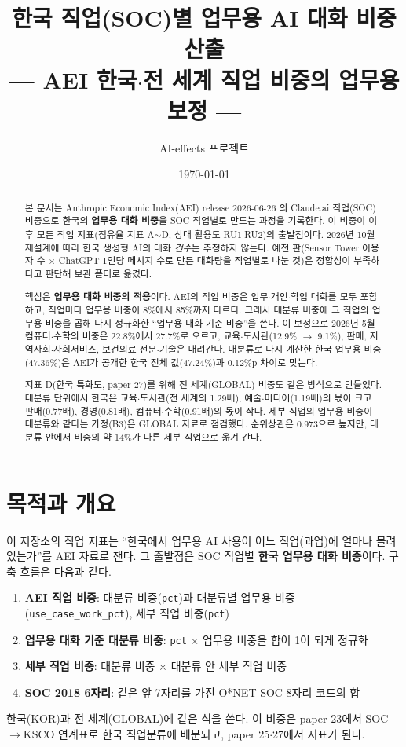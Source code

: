 \documentclass[11pt]{article}
\title{한국 직업(SOC)별 업무용 AI 대화 비중 산출\\[2mm]
\large --- AEI 한국$\cdot$전 세계 직업 비중의 업무용 보정 ---}
\author{AI-effects 프로젝트}
\date{\today}
\begin{document}
\maketitle

\begin{abstract}
\noindent 본 문서는 Anthropic Economic Index(AEI) release 2026-06-26 \parencite{massenkoff-2026-cadences}의 Claude.ai 직업(SOC) 비중으로 한국의 \textbf{업무용 대화 비중}을 SOC 직업별로 만드는 과정을 기록한다. 이 비중이 이후 모든 직업 지표(점유율 지표 A$\sim$D, 상대 활용도 RU1$\cdot$RU2)의 출발점이다. 2026년 10월 재설계에 따라 한국 생성형 AI의 대화 \emph{건수}는 추정하지 않는다. 예전 판(Sensor Tower 이용자 수 $\times$ ChatGPT 1인당 메시지 수로 만든 대화량을 직업별로 나눈 것)은 정합성이 부족하다고 판단해 보관 폴더로 옮겼다.

핵심은 \textbf{업무용 대화 비중의 적용}이다. AEI의 직업 비중은 업무$\cdot$개인$\cdot$학업 대화를 모두 포함하고, 직업마다 업무용 비중이 8\%에서 85\%까지 다르다. 그래서 대분류 비중에 그 직업의 업무용 비중을 곱해 다시 정규화한 ``업무용 대화 기준 비중''을 쓴다. 이 보정으로 2026년 5월 컴퓨터$\cdot$수학의 비중은 22.8\%에서 27.7\%로 오르고, 교육$\cdot$도서관(12.9\% $\to$ 9.1\%), 판매, 지역사회$\cdot$사회서비스, 보건의료 전문$\cdot$기술은 내려간다. 대분류로 다시 계산한 한국 업무용 비중(47.36\%)은 AEI가 공개한 한국 전체 값(47.24\%)과 0.12\%p 차이로 맞는다.

지표 D(한국 특화도, paper 27)를 위해 전 세계(GLOBAL) 비중도 같은 방식으로 만들었다. 대분류 단위에서 한국은 교육$\cdot$도서관(전 세계의 1.29배), 예술$\cdot$미디어(1.19배)의 몫이 크고 판매(0.77배), 경영(0.81배), 컴퓨터$\cdot$수학(0.91배)의 몫이 작다. 세부 직업의 업무용 비중이 대분류와 같다는 가정(B3)은 GLOBAL 자료로 점검했다. 순위상관은 0.973으로 높지만, 대분류 안에서 비중의 약 14\%가 다른 세부 직업으로 옮겨 간다.
\end{abstract}

\section{목적과 개요}

이 저장소의 직업 지표는 ``한국에서 업무용 AI 사용이 어느 직업(과업)에 얼마나 몰려 있는가''를 AEI 자료로 잰다. 그 출발점은 SOC 직업별 \textbf{한국 업무용 대화 비중}이다. 구축 흐름은 다음과 같다.
\begin{enumerate}[leftmargin=*]
  \item \textbf{AEI 직업 비중}: 대분류 비중(\texttt{pct})과 대분류별 업무용 비중(\texttt{use\_case\_work\_pct}), 세부 직업 비중(\texttt{pct})
  \item \textbf{업무용 대화 기준 대분류 비중}: \texttt{pct} $\times$ 업무용 비중을 합이 1이 되게 정규화
  \item \textbf{세부 직업 비중}: 대분류 비중 $\times$ 대분류 안 세부 직업 비중
  \item \textbf{SOC 2018 6자리}: 같은 앞 7자리를 가진 O*NET-SOC 8자리 코드의 합
\end{enumerate}
한국(KOR)과 전 세계(GLOBAL)에 같은 식을 쓴다. 이 비중은 paper 23에서 SOC$\to$KSCO 연계표로 한국 직업분류에 배분되고, paper 25$\cdot$27에서 지표가 된다.
\end{document}
